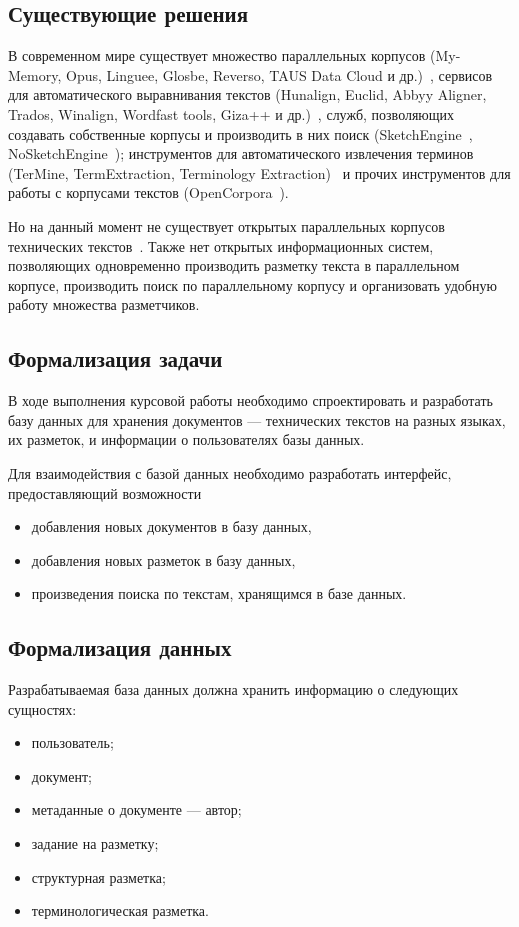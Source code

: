 \subsection{Существующие решения}

В современном мире существует множество параллельных корпусов (My-Memory, Opus, Linguee, Glosbe, Reverso, TAUS Data Cloud и др.)~\cite{butenko2020-1}, сервисов для автоматического выравнивания текстов (Hunalign, Euclid, Abbyy Aligner, Trados, Winalign, Wordfast tools, Giza++ и др.)~\cite{cl2020}, служб, позволяющих создавать собственные корпусы и производить в них поиск (SketchEngine~\cite{ske}, NoSketchEngine~\cite{noske}); инструментов для автоматического извлечения терминов (TerMine, TermExtraction, Terminology Extraction)~\cite{butenko2022} и прочих инструментов для работы с корпусами текстов (OpenCorpora~\cite{opencorpora}).

Но на данный момент не существует открытых параллельных корпусов технических текстов~\cite{butenko2020-2}.
Также нет открытых информационных систем, позволяющих одновременно производить разметку текста в параллельном корпусе, производить поиск по параллельному корпусу и организовать удобную работу множества разметчиков.

\subsection{Формализация задачи}

В ходе выполнения курсовой работы необходимо спроектировать и разработать базу данных для хранения документов --- технических текстов на разных языках, их разметок, и информации о пользователях базы данных.

Для взаимодействия с базой данных необходимо разработать интерфейс, предоставляющий возможности
\begin{itemize}
    \item добавления новых документов в базу данных,
    \item добавления новых разметок в базу данных,
    \item произведения поиска по текстам, хранящимся в базе данных.
\end{itemize}

\subsection{Формализация данных}

Разрабатываемая база данных должна хранить информацию о следующих сущностях:
\begin{itemize}
    \item пользователь;
    \item документ;
    \item метаданные о документе --- автор;
    \item задание на разметку;
    \item структурная разметка;
    \item терминологическая разметка.
\end{itemize}

